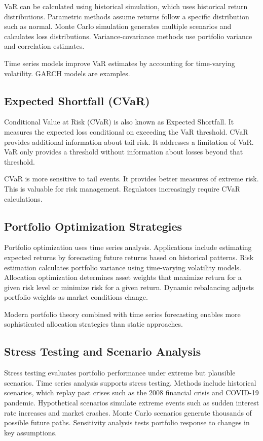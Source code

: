 VaR can be calculated using historical simulation, which uses historical return distributions. Parametric methods assume returns follow a specific distribution such as normal. Monte Carlo simulation generates multiple scenarios and calculates loss distributions. Variance-covariance methods use portfolio variance and correlation estimates.

Time series models improve VaR estimates by accounting for time-varying volatility. GARCH models are examples.

\subsection{Expected Shortfall (CVaR)}

Conditional Value at Risk (CVaR) is also known as Expected Shortfall. It measures the expected loss conditional on exceeding the VaR threshold. CVaR provides additional information about tail risk. It addresses a limitation of VaR. VaR only provides a threshold without information about losses beyond that threshold.

CVaR is more sensitive to tail events. It provides better measures of extreme risk. This is valuable for risk management. Regulators increasingly require CVaR calculations.

\subsection{Portfolio Optimization Strategies}

Portfolio optimization uses time series analysis. Applications include estimating expected returns by forecasting future returns based on historical patterns. Risk estimation calculates portfolio variance using time-varying volatility models. Allocation optimization determines asset weights that maximize return for a given risk level or minimize risk for a given return. Dynamic rebalancing adjusts portfolio weights as market conditions change.

Modern portfolio theory combined with time series forecasting enables more sophisticated allocation strategies than static approaches.

\subsection{Stress Testing and Scenario Analysis}

Stress testing evaluates portfolio performance under extreme but plausible scenarios. Time series analysis supports stress testing. Methods include historical scenarios, which replay past crises such as the 2008 financial crisis and COVID-19 pandemic. Hypothetical scenarios simulate extreme events such as sudden interest rate increases and market crashes. Monte Carlo scenarios generate thousands of possible future paths. Sensitivity analysis tests portfolio response to changes in key assumptions.

